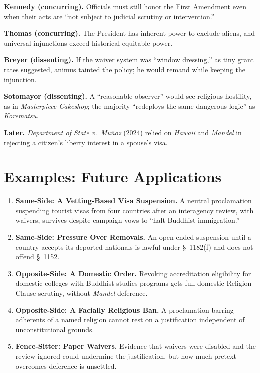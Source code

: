 \documentclass[12pt]{article}
\begin{document}
\textbf{Kennedy (concurring).} Officials must still honor the First Amendment even when their acts are ``not subject to judicial scrutiny or intervention.''

\textbf{Thomas (concurring).} The President has inherent power to exclude aliens, and universal injunctions exceed historical equitable power.

\textbf{Breyer (dissenting).} If the waiver system was ``window dressing,'' as tiny grant rates suggested, animus tainted the policy; he would remand while keeping the injunction.

\textbf{Sotomayor (dissenting).} A ``reasonable observer'' would see religious hostility, as in \textit{Masterpiece Cakeshop}; the majority ``redeploys the same dangerous logic'' as \textit{Korematsu}.

\textbf{Later.} \textit{Department of State v.\ Mu\~noz} (2024) relied on \textit{Hawaii} and \textit{Mandel} in rejecting a citizen's liberty interest in a spouse's visa.

\section{Examples: Future Applications}

\begin{enumerate}
\item \textbf{Same-Side: A Vetting-Based Visa Suspension.} A neutral proclamation suspending tourist visas from four countries after an interagency review, with waivers, survives despite campaign vows to ``halt Buddhist immigration.''
\item \textbf{Same-Side: Pressure Over Removals.} An open-ended suspension until a country accepts its deported nationals is lawful under \S~1182(f) and does not offend \S~1152.
\item \textbf{Opposite-Side: A Domestic Order.} Revoking accreditation eligibility for domestic colleges with Buddhist-studies programs gets full domestic Religion Clause scrutiny, without \textit{Mandel} deference.
\item \textbf{Opposite-Side: A Facially Religious Ban.} A proclamation barring adherents of a named religion cannot rest on a justification independent of unconstitutional grounds.
\item \textbf{Fence-Sitter: Paper Waivers.} Evidence that waivers were disabled and the review ignored could undermine the justification, but how much pretext overcomes deference is unsettled.
\end{enumerate}
\end{document}
